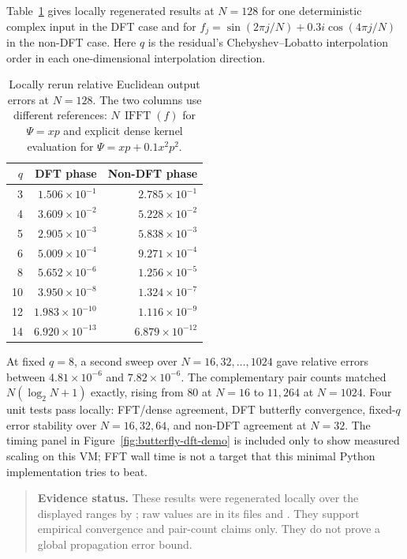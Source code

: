 \documentclass[11pt,a4paper]{article}
\newenvironment{evidence}{\begin{quote}\small\color{muted}\textbf{Evidence status.} }{\end{quote}}
\begin{document}
Table~\ref{tab:butterfly-accuracy} gives locally regenerated results at $N=128$ for one deterministic complex input in the DFT case and for $f_j=\sin(2\pi j/N)+0.3i\cos(4\pi j/N)$ in the non-DFT case. Here $q$ is the residual's Chebyshev--Lobatto interpolation order in each one-dimensional interpolation direction.
\begin{table}[htbp]
\centering\small
\caption{Locally rerun relative Euclidean output errors at $N=128$. The two columns use different references: $N\,\operatorname{IFFT}(f)$ for $\Psi=xp$ and explicit dense kernel evaluation for $\Psi=xp+0.1x^2p^2$.}
\label{tab:butterfly-accuracy}
\begin{tabular}{@{}rrr@{}}
\toprule
$q$ & DFT phase & Non-DFT phase \\
\midrule
3  & $1.506\times10^{-1}$ & $2.785\times10^{-1}$\\
4  & $3.609\times10^{-2}$ & $5.228\times10^{-2}$\\
5  & $2.905\times10^{-3}$ & $5.838\times10^{-3}$\\
6  & $5.009\times10^{-4}$ & $9.271\times10^{-4}$\\
8  & $5.652\times10^{-6}$ & $1.256\times10^{-5}$\\
10 & $3.950\times10^{-8}$ & $1.324\times10^{-7}$\\
12 & $1.983\times10^{-10}$ & $1.116\times10^{-9}$\\
14 & $6.920\times10^{-13}$ & $6.879\times10^{-12}$\\
\bottomrule
\end{tabular}
\end{table}

At fixed $q=8$, a second sweep over $N=16,32,\ldots,1024$ gave relative errors between $4.81\times10^{-6}$ and $7.82\times10^{-6}$. The complementary pair counts matched $N(\log_2N+1)$ exactly, rising from $80$ at $N=16$ to $11{,}264$ at $N=1024$. Four unit tests pass locally: FFT/dense agreement, DFT butterfly convergence, fixed-$q$ error stability over $N=16,32,64$, and non-DFT agreement at $N=32$. The timing panel in Figure~\ref{fig:butterfly-dft-demo} is included only to show measured scaling on this VM; FFT wall time is not a target that this minimal Python implementation tries to beat.
\begin{evidence}
These results were regenerated locally over the displayed ranges by ; raw values are in its  files and . They support empirical convergence and pair-count claims only. They do not prove a global propagation error bound.
\end{evidence}
\end{document}
